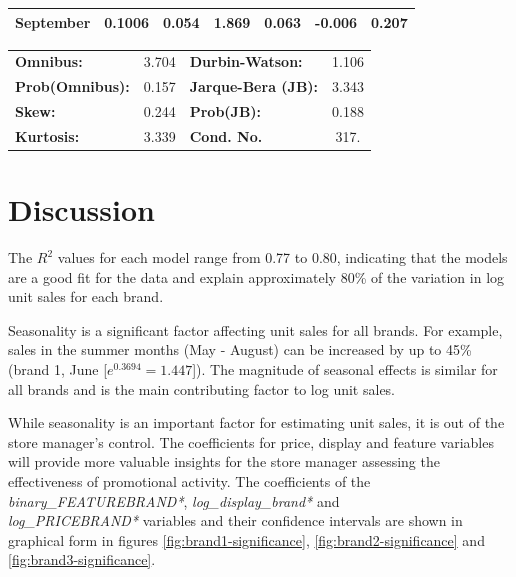 \documentclass[a4paper,11pt]{article}
\begin{document}
\begin{center}
\begin{tabular}{lcccccc}
\textbf{September}             &       0.1006  &        0.054     &     1.869  &         0.063        &       -0.006    &        0.207     \\
\bottomrule
\end{tabular}
\begin{tabular}{lclc}
\textbf{Omnibus:}       &  3.704 & \textbf{  Durbin-Watson:     } &    1.106  \\
\textbf{Prob(Omnibus):} &  0.157 & \textbf{  Jarque-Bera (JB):  } &    3.343  \\
\textbf{Skew:}          &  0.244 & \textbf{  Prob(JB):          } &    0.188  \\
\textbf{Kurtosis:}      &  3.339 & \textbf{  Cond. No.          } &     317.  \\
\bottomrule
\end{tabular}
\end{center}
\newpage

\section{Discussion}

The $R^2$ values for each model range from 0.77 to 0.80, indicating that the models are a good fit for the data and explain approximately 80\% of the variation in log unit sales for each brand. 

Seasonality is a significant factor affecting unit sales for all brands. For example, sales in the summer months (May - August) can be increased by up to 45\% (brand 1, June [$e^{0.3694}=1.447$]). The magnitude of seasonal effects is similar for all brands and is the main contributing factor to log unit sales.

While seasonality is an important factor for estimating unit sales, it is out of the store manager's control. The coefficients for price, display and feature variables will provide more valuable insights for the store manager assessing the effectiveness of promotional activity. The coefficients of the \textit{binary\_FEATUREBRAND*}, \textit{log\_display\_brand*} and \\ \textit{log\_PRICEBRAND*} variables and their confidence intervals are shown in graphical form in figures \ref{fig:brand1-significance}, \ref{fig:brand2-significance} and \ref{fig:brand3-significance}.
\end{document}
